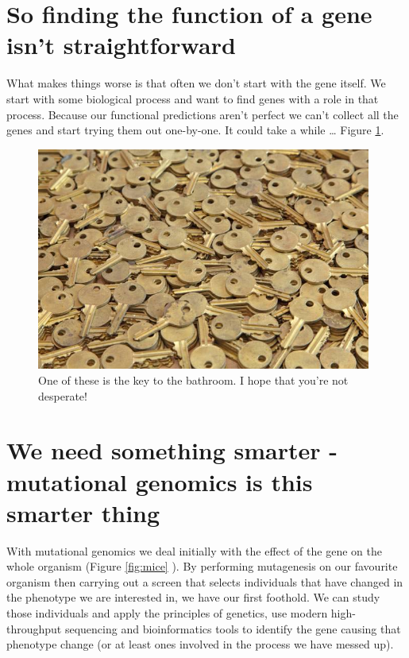 \documentclass[12pt,]{book}
\begin{document}
\section*{So finding the function of a gene isn't
straightforward}\label{so-finding-the-function-of-a-gene-isnt-straightforward}

What makes things worse is that often we don't start with the gene
itself. We start with some biological process and want to find genes
with a role in that process. Because our functional predictions aren't
perfect we can't collect all the genes and start trying them out
one-by-one. It could take a while \ldots{} Figure \ref{fig:keys}.

\begin{figure}
\includegraphics[width=4.33in]{assets/keys} \caption{One of these is the key to the bathroom. I hope that you're not desperate!}\label{fig:keys}
\end{figure}

\section*{We need something smarter - mutational genomics is this
smarter
thing}\label{we-need-something-smarter---mutational-genomics-is-this-smarter-thing}

With mutational genomics we deal initially with the effect of the gene
on the whole organism (Figure \ref{fig:mice} ). By performing
mutagenesis on our favourite organism then carrying out a screen that
selects individuals that have changed in the phenotype we are interested
in, we have our first foothold. We can study those individuals and apply
the principles of genetics, use modern high-throughput sequencing and
bioinformatics tools to identify the gene causing that phenotype change
(or at least ones involved in the process we have messed up).
\end{document}
